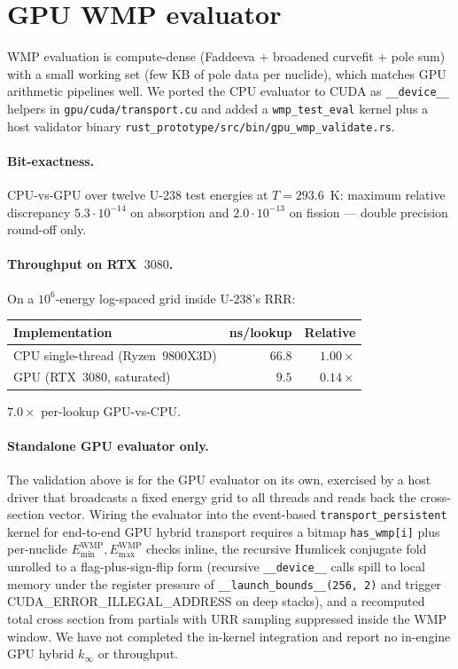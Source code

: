 \section{GPU WMP evaluator}
\label{sec:gpu_wmp}

WMP evaluation is compute-dense (Faddeeva + broadened
curvefit + pole sum) with a small working set (few KB of
pole data per nuclide), which matches GPU arithmetic
pipelines well. We ported the CPU evaluator to CUDA as
\texttt{\_\_device\_\_} helpers in
\texttt{gpu/cuda/transport.cu} and added a
\texttt{wmp\_test\_eval} kernel plus a host validator binary
\texttt{rust\_prototype/src/bin/gpu\_wmp\_validate.rs}.

\paragraph{Bit-exactness.}
CPU-vs-GPU over twelve U-$238$ test energies at $T = 293.6$~K:
maximum relative discrepancy $5.3 \cdot 10^{-14}$ on
absorption and $2.0 \cdot 10^{-13}$ on fission --- double
precision round-off only.

\paragraph{Throughput on RTX~$3080$.}
On a $10^6$-energy log-spaced grid inside U-$238$'s RRR:

\begin{center}
\begin{tabular}{@{}lrr@{}}
\toprule
Implementation & ns/lookup & Relative \\
\midrule
CPU single-thread (Ryzen~$9800$X3D) & $66.8$ & $1.00\times$ \\
GPU (RTX~$3080$, saturated)         & $9.5$  & $0.14\times$ \\
\bottomrule
\end{tabular}
\end{center}

$7.0\times$ per-lookup GPU-vs-CPU.

\paragraph{Standalone GPU evaluator only.}
The validation above is for the GPU evaluator on its own,
exercised by a host driver that broadcasts a fixed energy
grid to all threads and reads back the cross-section vector.
Wiring the evaluator into the event-based
\texttt{transport\_persistent} kernel for end-to-end GPU
hybrid transport requires a bitmap \texttt{has\_wmp[i]}
plus per-nuclide $E_{\min}^{\mathrm{WMP}}, E_{\max}^{\mathrm{WMP}}$
checks inline, the recursive Humlicek conjugate fold unrolled
to a flag-plus-sign-flip form (recursive
\verb|__device__| calls spill to local memory under the
register pressure of \texttt{\_\_launch\_bounds\_\_(256,\,2)}
and trigger CUDA\_ERROR\_ILLEGAL\_ADDRESS on deep stacks),
and a recomputed total cross section from partials with URR
sampling suppressed inside the WMP window. We have not
completed the in-kernel integration and report no in-engine
GPU hybrid $k_\infty$ or throughput.

